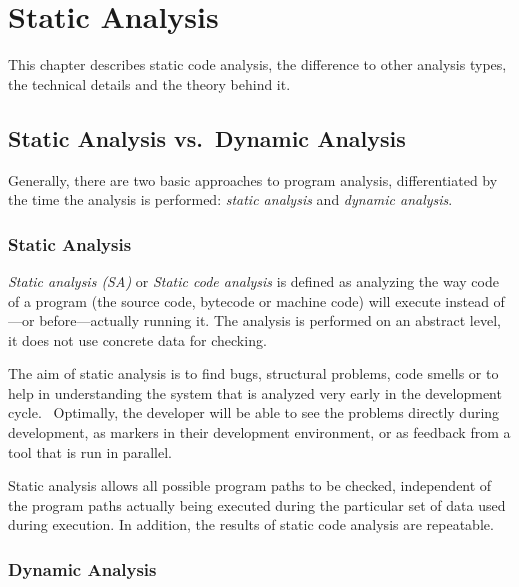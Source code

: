 \chapter{Static Analysis}
\label{static-analysis}

This chapter describes static code analysis, the difference to other analysis types, the technical details and the theory behind it.

\section{Static Analysis vs.~Dynamic Analysis}

Generally, there are two basic approaches to program analysis, differentiated by the time the analysis is performed: \emph{static analysis} and \emph{dynamic analysis}.

\subsection{Static Analysis}

\emph{Static analysis (SA)} or \emph{Static code analysis} is defined as analyzing the way code of a program (the source code, bytecode or machine code) will execute instead of---or before---actually running it. The analysis is performed on an abstract level, \ie it does not use concrete data for checking.~\cite{static-code-analysis}

The aim of static analysis is to find bugs, structural problems, code smells or to help in understanding the system that is analyzed very early in the development cycle.~\cite{data-flow-analysis, chess-west} Optimally, the developer will be able to see the problems directly during development, \eg as markers in their development environment, or as feedback from a tool that is run in parallel.

Static analysis allows all possible program paths to be checked, independent of the program paths actually being executed during the particular set of data used during execution. In addition, the results of static code analysis are repeatable.~\cite{coverity-report}

\subsection{Dynamic Analysis}

